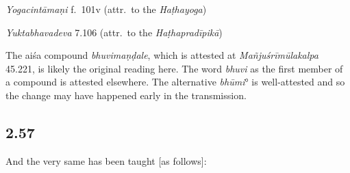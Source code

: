 \begin{ekdosis}
\begin{testimonia}[hp02_056]
\emph{Yogacintāmaṇi} f.~101v (attr.~to the \emph{Haṭhayoga})

\begin{versinnote}
\end{versinnote}

\emph{Yuktabhavadeva} 7.106 (attr.~to the \emph{Haṭhapradīpikā})

\begin{versinnote}
\end{versinnote}

\end{testimonia}

\begin{philcomm}[hp02_056]
The aiśa compound \emph{bhuvimaṇḍale}, which is attested at \emph{Mañjuśrīmūlakalpa} 45.221, is likely the original reading here. The word  \emph{bhuvi} as the first member of a compound is attested elsewhere. The alternative \emph{bhūmi}° is well-attested and so the change may have happened early in the transmission. 
\end{philcomm}


\subsection*{2.57}
\begin{translation}[hp02_057]
And the very same has been taught [as follows]:


\end{translation}
\end{ekdosis}
